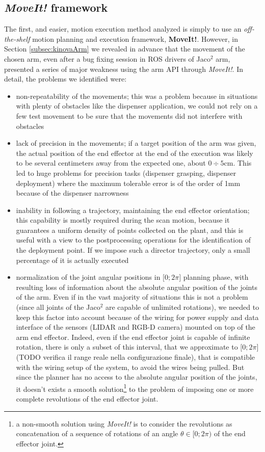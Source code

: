\subsection{\textit{MoveIt!} framework}
The first, and easier, motion execution method analyzed is simply to use an \textit{off-the-shelf} motion planning and execution framework, \textbf{MoveIt!}. However, in Section \ref{subsec:kinovaArm} we revealed in advance that the movement of the chosen arm, even after a bug fixing session in \ac{ROS} drivers of Jaco$^2$ arm, presented a series of major weakness using the arm \ac{API} through \textit{MoveIt!}. In detail, the problems we identified were:
\begin{itemize}
	\item non-repeatability of the movements; this was a problem because in situations with plenty of obstacles like the dispenser application, we could not rely on a few test movement to be sure that the movements did not interfere with obstacles
	\item lack of precision in the movements; if a target position of the arm was given, the actual position of the end effector at the end of the execution was likely to be several centimeters away from the expected one, about $0\div5$cm. This led to huge problems for precision tasks (dispenser grasping, dispenser deployment) where the maximum tolerable error is of the order of 1mm because of the dispenser narrowness
	\item inability in following a trajectory, maintaining the end effector orientation; this capability is mostly required during the scan motion, because it guarantees a uniform density of points collected on the plant, and this is useful with a view to the postprocessing operations for the identification of the deployment point. If we impose such a director trajectory, only a small percentage of it is actually executed
	\item normalization of the joint angular positions in $\lbrack 0;2\pi\rbrack$ planning phase, with resulting loss of information about the absolute angular position of the joints of the arm. Even if in the vast majority of situations this is not a problem (since all joints of the Jaco$^2$ are capable of unlimited rotations), we needed to keep this factor into account because of the wiring for power supply and data interface of the sensors (\ac{LIDAR} and RGB-D camera) mounted on top of the arm end effector. Indeed, even if the end effector joint is capable of infinite rotation, there is only a subset of this interval, that we approximate to $\lbrack0;2\pi\rbrack$ (TODO verifica il range reale nella configurazione finale), that is compatible with the wiring setup of the system, to avoid the wires being pulled. But since the planner has no access to the absolute angular position of the joints, it doesn't exists a smooth solution\footnote{a non-smooth solution using \textit{MoveIt!} is to consider the revolutions as concatenation of a sequence of rotations of an angle $\theta\in\lbrack0;2\pi)$ of the end effector joint.}
to the problem of imposing one or more complete revolutions of the end effector joint.
\end{itemize}

